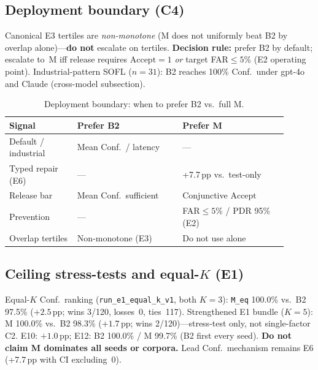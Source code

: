 \subsection{Deployment boundary (C4)}
Canonical E3 tertiles are \emph{non-monotone} (M does not uniformly beat B2
by overlap alone)---\textbf{do not} escalate on tertiles.
\textbf{Decision rule:} prefer B2 by default; escalate to~M iff release
requires $\mathrm{Accept}{=}1$ \emph{or} target FAR${\le}5\%$ (E2 operating
point).
Industrial-pattern SOFL ($n{=}31$): B2 reaches 100\% Conf.\ under gpt-4o and
Claude (cross-model subsection).

\begin{table}[t]
  \centering
  \caption{Deployment boundary: when to prefer B2 vs.\ full M.}
  \label{tab:deploy}
  \footnotesize
  \begin{tabular}{@{}p{0.22\linewidth}p{0.34\linewidth}p{0.34\linewidth}@{}}
    \toprule
    \textbf{Signal} & \textbf{Prefer B2} & \textbf{Prefer M} \\
    \midrule
    Default / industrial & Mean Conf.\ / latency & --- \\
    Typed repair (E6) & --- & +7.7\,pp vs.\ test-only \\
    Release bar & Mean Conf.\ sufficient & Conjunctive $\mathrm{Accept}$ \\
    Prevention & --- & FAR${\le}5\%$ / PDR 95\% (E2) \\
    Overlap tertiles & Non-monotone (E3) & Do not use alone \\
    \bottomrule
  \end{tabular}
\end{table}

\subsection{Ceiling stress-tests and equal-$K$ (E1)}
Equal-$K$ Conf.\ ranking (\texttt{run\_e1\_equal\_k\_v1}, both $K{=}3$):
\texttt{M\_eq} 100.0\% vs.\ B2 97.5\% (${+}2.5$\,pp; wins 3/120, losses~0,
ties~117).
Strengthened E1 bundle ($K{=}5$): M 100.0\% vs.\ B2 98.3\% (${+}1.7$\,pp;
wins 2/120)---stress-test only, not single-factor C2.
E10: ${+}1.0$\,pp; E12: B2 100.0\% / M 99.7\% (B2 first every seed).
\textbf{Do not claim M dominates all seeds or corpora.}
Lead Conf.\ mechanism remains E6 (+7.7\,pp with CI excluding~0).
